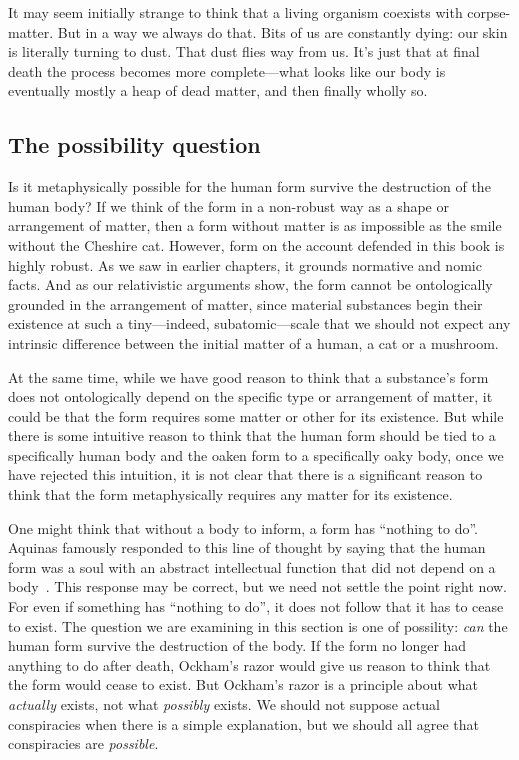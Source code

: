 It may seem initially strange to think that a living organism coexists with corpse-matter. But in a way we always do 
that. Bits of us are constantly dying: our skin is literally turning to dust. That dust flies way from us. It's just
that at final death the process becomes more complete---what looks like our body is eventually mostly a heap of dead matter, and then finally wholly so. 

\subsection{The possibility question}
Is it metaphysically possible for the human form survive the destruction of the human body? If we think of the form in a non-robust way as 
a shape or arrangement of matter, then a form without matter is as 
impossible as the smile without the Cheshire cat. However, form on the account defended in this book is highly robust. 
As we saw in earlier chapters, it grounds normative and nomic facts. And as our relativistic arguments show, the form cannot
be ontologically grounded in the arrangement of matter, since material substances begin their existence at such a tiny---indeed, subatomic---scale  that we should not expect any intrinsic difference between the initial matter of a human, a cat or a mushroom.

At the same time, while we have good reason to think that a substance's form does not ontologically depend on the specific type or arrangement of matter, it could be that the form requires some matter or other for its existence. But while there is some intuitive 
reason to think that the human form should be tied to a specifically human body and the oaken form to a specifically oaky body,
once we have rejected this intuition, it is not clear that there is a significant reason to think that the form 
metaphysically requires any 
matter for its existence. 

One might think that without a body to inform, a form has ``nothing to do''. Aquinas famously responded to this line of thought
by saying that the human form was a soul with an abstract intellectual function that did not depend on a body~\parencite[I, 75, 2]{AquinasST}. This response may 
be correct, but we need not settle the point right now. For even if something has ``nothing to do'', it does not follow that 
it has to cease to exist. The question we are examining in this section is one of possility: \textit{can} the human form survive the 
destruction of the body. If the form no longer had anything to do after death, Ockham's razor would give us reason to think that the form would cease to exist. But Ockham's razor is a principle about what \textit{actually} exists, not what \textit{possibly}
exists. We should not suppose actual conspiracies when there is a simple explanation, but we should all agree that conspiracies
are \textit{possible}. 

